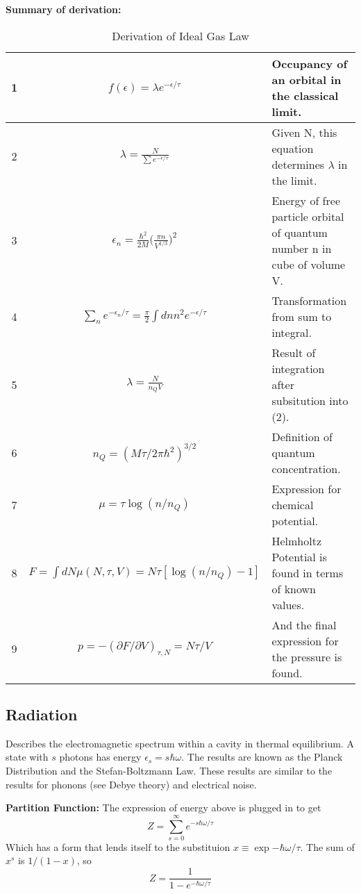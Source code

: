 \textbf{Summary of derivation:}
\begin{table}[!hbtp]
    \centering
    \begin{tabular}{c | c p{4cm}}
        \toprule
        1 & $f(\epsilon) = \lambda e^{-\epsilon/\tau}$    & Occupancy of an orbital in the classical limit. \\
        \midrule
        2 & $\lambda = \frac{N}{\sum e^{-\epsilon/\tau}}$ & Given N, this equation determines $\lambda$ in the limit. \\
        \midrule
        3 & $\epsilon_n = \frac{\hbar^2}{2M} \bigg( \frac{\pi n}{V^{1/3}} \bigg)^2 $ & Energy of free particle orbital of quantum number n in cube of volume V. \\
        \midrule
        4 & $\sum_n e^{-\epsilon_n/\tau} = \frac{\pi}{2} \int dn n^2 e^{-\epsilon/\tau} $ & Transformation from sum to integral. \\
        \midrule
        5 & $\lambda = \frac{N}{n_Q V}$ & Result of integration after subsitution into (2). \\
        \midrule
        6 & $n_Q = (M\tau/2\pi \hbar^2)^{3/2}$ & Definition of quantum concentration. \\
        \midrule
        7 & $\mu = \tau \log{(n/n_Q)}$ & Expression for chemical potential. \\
        \midrule
        8 & $F = \int dN \mu(N,\tau,V) = N\tau [\log{(n/n_Q)} - 1]$ & Helmholtz Potential is found in terms of known values. \\
        \midrule
        9 & $p = -(\partial F/\partial V)_{\tau, N} = N\tau/V $ & And the final expression for the pressure is found. \\
        \bottomrule
    \end{tabular}
    \caption{Derivation of Ideal Gas Law}
    \label{tab:ideal}
\end{table}



\subsection{Radiation}
Describes the electromagnetic spectrum within a cavity in thermal equilibrium. A state with $s$ photons has energy $\epsilon_s = s \hbar \omega$. The results are known as the Planck Distribution and the Stefan-Boltzmann Law. These results are similar to the results for phonons (see Debye theory) and electrical noise.

\textbf{Partition Function: }The expression of energy above is plugged in to get
\[
Z = \sum_{s=0}^\infty e^{-s\hbar \omega/\tau}
\]
Which has a form that lends itself to the substituion $x\equiv \exp{-\hbar \omega /\tau}$. The sum of $x^s$ is $1/(1-x)$, so
\[
Z = \frac{1}{1-e^{-\hbar \omega/\tau}}
\]


